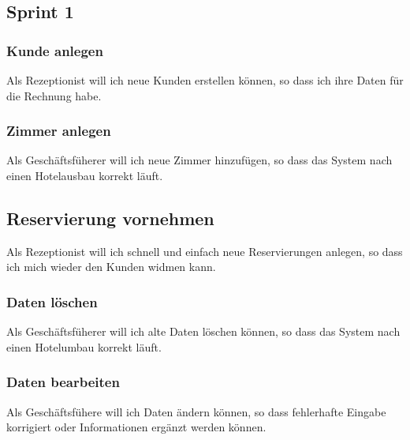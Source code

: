 \documentclass[11pt]{scrartcl}
\begin{document}
\subsection{Sprint 1}

\subsubsection{Kunde anlegen}

Als Rezeptionist will ich neue Kunden erstellen können, so dass ich ihre Daten für die Rechnung habe.

\subsubsection{Zimmer anlegen}

Als Geschäftsfüherer will ich neue Zimmer hinzufügen, so dass das System nach einen Hotelausbau korrekt läuft.

\subsection{Reservierung vornehmen}

Als Rezeptionist will ich schnell und einfach neue Reservierungen anlegen, so dass ich mich wieder den Kunden widmen kann.

\subsubsection{Daten löschen}

Als Geschäftsfüherer will ich alte Daten löschen können, so dass das System nach einen Hotelumbau korrekt läuft.

\subsubsection{Daten bearbeiten}

Als Geschäftsfühere will ich Daten ändern können, so dass fehlerhafte Eingabe korrigiert oder Informationen ergänzt werden können.
\end{document}
